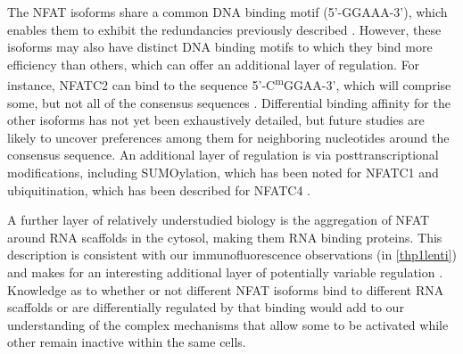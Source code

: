 The NFAT isoforms share a common DNA binding motif (5'\hyp{}GGAAA\hyp{}3'), which enables them to exhibit the redundancies previously described \citep{Rao1997, Chen1998}. However, these isoforms may also have distinct DNA binding motifs to which they bind more efficiency than others, which can offer an additional layer of regulation. For instance, NFATC2 can bind to the sequence 5'\hyp{}C\textsuperscript{m}GGAA\hyp{}3', which will comprise some, but not all of the consensus sequences \citep{Ray2021}. Differential binding affinity for the other isoforms has not yet been exhaustively detailed, but future studies are likely to uncover preferences among them for neighboring nucleotides around the consensus sequence. An additional layer of regulation is via posttranscriptional modifications, including SUMOylation, which has been noted for NFATC1 and ubiquitination, which has been described for NFATC4 \citep{Fan2008, Xiao2021}.

A further layer of relatively understudied biology is the aggregation of NFAT around RNA scaffolds in the cytosol, making them RNA binding proteins. This description is consistent with our immunofluorescence observations (in \autoref{thp1lenti}) and makes for an interesting additional layer of potentially variable regulation \citep{Sharma2011}. Knowledge as to whether or not different NFAT isoforms bind to different RNA scaffolds or are differentially regulated by that binding would add to our understanding of the complex mechanisms that allow some to be activated while other remain inactive within the same cells.

